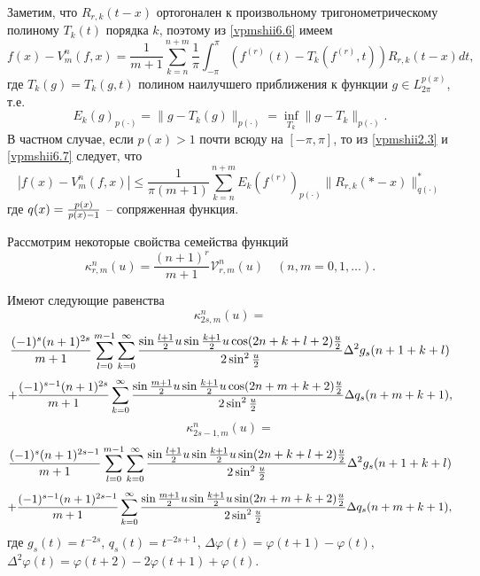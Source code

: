 Заметим, что $R_{r,k}(t-x)$ ортогонален к произвольному тригонометрическому полиному $T_k(t)$
порядка $k$, поэтому из \eqref{vpmshii6.6} имеем
\begin{equation}\label{vpmshii6.7}
  f(x)-V_m^n(f,x)= \frac{1}{m+1}\sum_{k=n}^{n+m}\frac{1}{\pi}\int_{-\pi}^\pi (f^{(r)}(t)-T_k(f^{(r)},t))R_{r,k}(t-x)dt,
 \end{equation}
где $T_k(g)=T_k(g,t)$ полином наилучшего приближения к функции  $g\in L_{2\pi}^{p(x)}$, т.е.
\begin{equation}\label{vpmshii6.8}
    E_k(g)_{p(\cdot)}=\|g-T_k(g)\|_{p(\cdot)}=\inf_{T_k}\|g-T_k\|_{p(\cdot)}.
\end{equation}
В частном случае, если $p(x)>1$ почти всюду на $[-\pi,\pi]$, то из \eqref{vpmshii2.3} и \eqref{vpmshii6.7} следует, что
\begin{equation}\label{vpmshii6.9}
    |f(x)-V_m^n(f,x)|\le \frac{1}{\pi(m+1)}\sum_{k=n}^{n+m}E_k(f^{(r)})_{p(\cdot)}\|R_{r,k}(*-x)\|_{q(\cdot)}^*
\end{equation}
где $q(x)={p(x)\over p(x)-1}$ -- сопряженная функция.

Рассмотрим некоторые свойства семейства функций
\begin{equation}\label{vpmshii6.10}
    \kappa_{r,m}^n(u)=\frac{(n+1)^r}{m+1}\mathcal{ V}_{r,m}^n(u) \quad (n,m=0,1,\ldots).
\end{equation}

\begin{lemma}\label{vpmshiil6.1} Имеют следующие равенства
 $$
 \kappa_{2s,m}^n(u)=
 $$
 $$
 {(-1)^s(n+1)^{2s}\over m+1}\sum\limits_{l=0}^{m-1}
\sum\limits_{k=0}^{\infty}\frac{\sin\frac{l+1}{2}u\sin\frac{k+1}{2}u\cos(2n+k+l+2)
\frac u2}{2\sin^2\frac u2}\Delta^2g_s(n+1+k+l)
$$
 \begin{equation}\label{vpmshii6.11}
    +{(-1)^{s-1}(n+1)^{2s}\over m+1}\sum\limits_{k=0}^{\infty}
\frac{\sin\frac {m+1}{2}u\sin\frac{k+1}{2}u\cos(2n+m+k+2)\frac u2}{2\sin^2\frac u2}
\Delta q_s(n+m+k+1),
 \end{equation}
$$
 \kappa_{2s-1,m}^n(u)=
 $$
 $$
 {(-1)^s(n+1)^{2s-1}\over m+1}\sum\limits_{l=0}^{m-1}
\sum\limits_{k=0}^{\infty}\frac{\sin\frac{l+1}{2}u\sin\frac{k+1}{2}u\sin(2n+k+l+2)
\frac u2}{2\sin^2\frac u2}\Delta^2g_s(n+1+k+l)
 $$
 \begin{equation}\label{vpmshii6.12}
 +{(-1)^{s-1}(n+1)^{2s-1}\over m+1}\sum\limits_{k=0}^{\infty}
\frac{\sin\frac {m+1}{2}u\sin\frac{k+1}{2}u\sin(2n+m+k+2)\frac u2}{2\sin^2\frac u2}
\Delta q_s(n+m+k+1),
  \end{equation}
 где $g_s(t)=t^{-2s}$, $q_s(t)=t^{-2s+1}$, $\Delta\varphi(t)=\varphi(t+1)-\varphi(t)$,
 $\Delta^2\varphi(t)=\varphi(t+2)-2\varphi(t+1)+\varphi(t)$.
\end{lemma}

